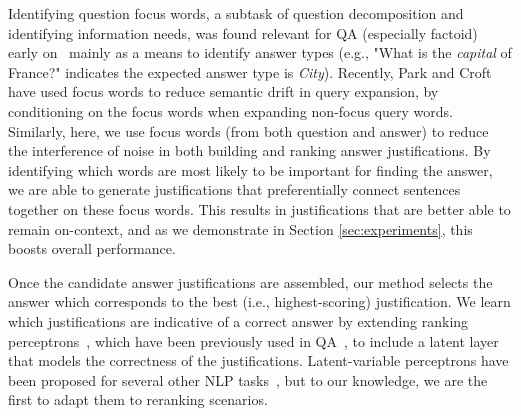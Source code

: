 Identifying question focus words, a subtask of question decomposition and identifying information needs, was found relevant for QA (especially factoid) early on~\cite[inter alia]{Harabagiu:00,Moldovan:2003:PIE:763693.763694} mainly as a means to identify answer types (e.g., "What is the {\em capital} of France?" indicates the expected answer type is \emph{City}).  
Recently, Park and Croft~ have used focus words to reduce semantic drift in query expansion, by conditioning on the focus words when expanding non-focus query words.
Similarly, here, we use focus words (from both question and answer) to reduce the interference of noise in both building and ranking answer justifications.  By identifying which words are most likely to be important for finding the answer, we are able to generate justifications that preferentially connect sentences together on these focus words.  This results in justifications that are better able to remain on-context, and as we demonstrate in Section \ref{sec:experiments}, this boosts overall performance. 

Once the candidate answer justifications are assembled, our method selects the answer which corresponds to the best (i.e., highest-scoring) justification.  We learn which justifications are indicative of a correct answer by extending ranking perceptrons~\cite{Shen:Joshi:2005}, which have been previously used in QA~\cite{Surdeanu:11}, to include a latent layer that models the correctness of the justifications. Latent-variable perceptrons have been proposed for several other NLP tasks~\cite{liang2006end,zettlemoyer2007online,sun2009latent,hoffmann2011knowledge,fernandes2012latent,bjorkelund2014learning}, but to our knowledge, we are the first to adapt them to reranking scenarios. 


